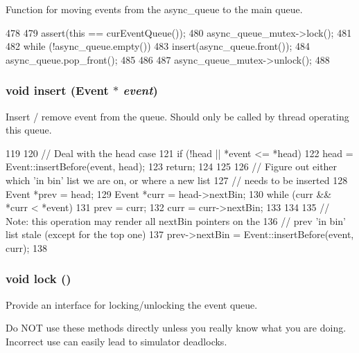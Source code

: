 Function for moving events from the async\_\-queue to the main queue. 


\begin{DoxyCode}
478 {
479     assert(this == curEventQueue());
480     async_queue_mutex->lock();
481 
482     while (!async_queue.empty()) {
483         insert(async_queue.front());
484         async_queue.pop_front();
485     }
486 
487     async_queue_mutex->unlock();
488 }
\end{DoxyCode}
\hypertarget{classEventQueue_ad8e469f292d876af9e2ec380e8e7e51e}{
\subsubsection[{insert}]{\setlength{\rightskip}{0pt plus 5cm}void insert (Event $\ast$ {\em event})}}
\label{classEventQueue_ad8e469f292d876af9e2ec380e8e7e51e}
Insert / remove event from the queue. Should only be called by thread operating this queue. 


\begin{DoxyCode}
119 {
120     // Deal with the head case
121     if (!head || *event <= *head) {
122         head = Event::insertBefore(event, head);
123         return;
124     }
125 
126     // Figure out either which 'in bin' list we are on, or where a new list
127     // needs to be inserted
128     Event *prev = head;
129     Event *curr = head->nextBin;
130     while (curr && *curr < *event) {
131         prev = curr;
132         curr = curr->nextBin;
133     }
134 
135     // Note: this operation may render all nextBin pointers on the
136     // prev 'in bin' list stale (except for the top one)
137     prev->nextBin = Event::insertBefore(event, curr);
138 }
\end{DoxyCode}
\hypertarget{classEventQueue_aa81aed607133209dade63a226818224d}{
\subsubsection[{lock}]{\setlength{\rightskip}{0pt plus 5cm}void lock ()}}
\label{classEventQueue_aa81aed607133209dade63a226818224d}
Provide an interface for locking/unlocking the event queue.

Do NOT use these methods directly unless you really know what you are doing. Incorrect use can easily lead to simulator deadlocks.

